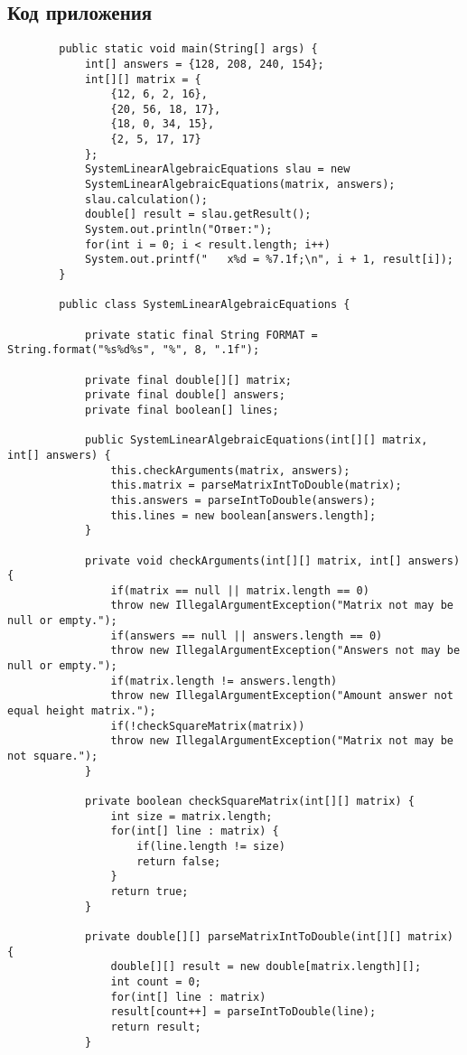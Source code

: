 \documentclass[12pt,a4paper]{scrartcl}
\begin{document}
	\subsection{Код приложения}
	\label{sec:exp:code}
	\begin{verbatim}
		public static void main(String[] args) {
			int[] answers = {128, 208, 240, 154};
			int[][] matrix = {
				{12, 6, 2, 16},
				{20, 56, 18, 17},
				{18, 0, 34, 15},
				{2, 5, 17, 17}
			};
			SystemLinearAlgebraicEquations slau = new
			SystemLinearAlgebraicEquations(matrix, answers);
			slau.calculation();
			double[] result = slau.getResult();
			System.out.println("Ответ:");
			for(int i = 0; i < result.length; i++)
			System.out.printf("   x%d = %7.1f;\n", i + 1, result[i]);
		}
	
	    public class SystemLinearAlgebraicEquations {
	    	
	    	private static final String FORMAT = String.format("%s%d%s", "%", 8, ".1f");
	    	
	    	private final double[][] matrix;
	    	private final double[] answers;
	    	private final boolean[] lines;
	    	
	    	public SystemLinearAlgebraicEquations(int[][] matrix, int[] answers) {
	    		this.checkArguments(matrix, answers);
	    		this.matrix = parseMatrixIntToDouble(matrix);
	    		this.answers = parseIntToDouble(answers);
	    		this.lines = new boolean[answers.length];
	    	}
	    	
	    	private void checkArguments(int[][] matrix, int[] answers) {
	    		if(matrix == null || matrix.length == 0)
	    		throw new IllegalArgumentException("Matrix not may be null or empty.");
	    		if(answers == null || answers.length == 0)
	    		throw new IllegalArgumentException("Answers not may be null or empty.");
	    		if(matrix.length != answers.length)
	    		throw new IllegalArgumentException("Amount answer not equal height matrix.");
	    		if(!checkSquareMatrix(matrix))
	    		throw new IllegalArgumentException("Matrix not may be not square.");
	    	}
	    	
	    	private boolean checkSquareMatrix(int[][] matrix) {
	    		int size = matrix.length;
	    		for(int[] line : matrix) {
	    			if(line.length != size)
	    			return false;
	    		}
	    		return true;
	    	}
	    	
	    	private double[][] parseMatrixIntToDouble(int[][] matrix) {
	    		double[][] result = new double[matrix.length][];
	    		int count = 0;
	    		for(int[] line : matrix)
	    		result[count++] = parseIntToDouble(line);
	    		return result;
	    	}
	    	

\end{verbatim}
\end{document}
